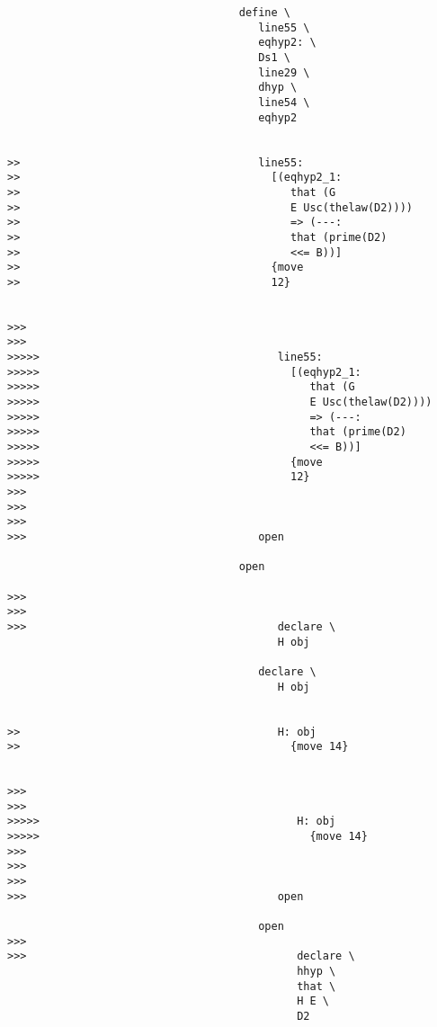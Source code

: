 \documentclass[12pt]{article}
\begin{document}
\begin{verbatim}
                                    define \
                                       line55 \
                                       eqhyp2: \
                                       Ds1 \
                                       line29 \
                                       dhyp \
                                       line54 \
                                       eqhyp2


>>                                     line55:
>>                                       [(eqhyp2_1:
>>                                          that (G
>>                                          E Usc(thelaw(D2))))
>>                                          => (---:
>>                                          that (prime(D2)
>>                                          <<= B))]
>>                                       {move
>>                                       12}


>>>
>>>
>>>>>                                     line55:
>>>>>                                       [(eqhyp2_1:
>>>>>                                          that (G
>>>>>                                          E Usc(thelaw(D2))))
>>>>>                                          => (---:
>>>>>                                          that (prime(D2)
>>>>>                                          <<= B))]
>>>>>                                       {move
>>>>>                                       12}
>>>
>>>
>>>
>>>                                    open

                                    open

>>>
>>>
>>>                                       declare \
                                          H obj

                                       declare \
                                          H obj


>>                                        H: obj
>>                                          {move 14}


>>>
>>>
>>>>>                                        H: obj
>>>>>                                          {move 14}
>>>
>>>
>>>
>>>                                       open

                                       open
>>>
>>>                                          declare \
                                             hhyp \
                                             that \
                                             H E \
                                             D2


\end{verbatim}
\end{document}
